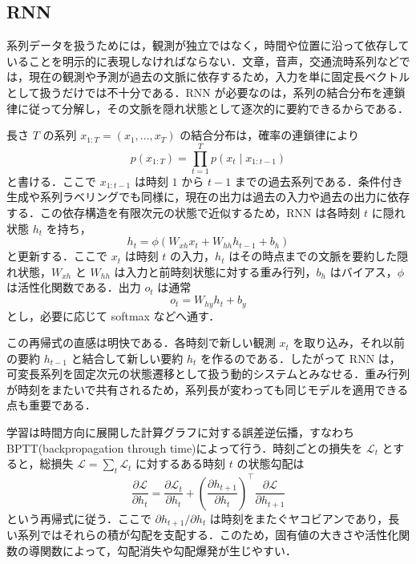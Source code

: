 \subsection{RNN}
系列データを扱うためには，観測が独立ではなく，時間や位置に沿って依存していることを明示的に表現しなければならない．文章，音声，交通流時系列などでは，現在の観測や予測が過去の文脈に依存するため，入力を単に固定長ベクトルとして扱うだけでは不十分である．RNN が必要なのは，系列の結合分布を連鎖律に従って分解し，その文脈を隠れ状態として逐次的に要約できるからである．

長さ $T$ の系列 $x_{1:T}=(x_1,\dots,x_T)$ の結合分布は，確率の連鎖律により
\begin{equation}
p(x_{1:T})
= \prod_{t=1}^T p(x_t\mid x_{1:t-1})
\end{equation}
と書ける．ここで $x_{1:t-1}$ は時刻 $1$ から $t-1$ までの過去系列である．条件付き生成や系列ラベリングでも同様に，現在の出力は過去の入力や過去の出力に依存する．この依存構造を有限次元の状態で近似するため，RNN は各時刻 $t$ に隠れ状態 $h_t$ を持ち，
\begin{equation}
h_t = \phi(W_{xh}x_t + W_{hh}h_{t-1} + b_h)
\end{equation}
と更新する．ここで $x_t$ は時刻 $t$ の入力，$h_t$ はその時点までの文脈を要約した隠れ状態，$W_{xh}$ と $W_{hh}$ は入力と前時刻状態に対する重み行列，$b_h$ はバイアス，$\phi$ は活性化関数である．出力 $o_t$ は通常
\begin{equation}
o_t = W_{hy}h_t + b_y
\end{equation}
とし，必要に応じて softmax などへ通す．

この再帰式の直感は明快である．各時刻で新しい観測 $x_t$ を取り込み，それ以前の要約 $h_{t-1}$ と結合して新しい要約 $h_t$ を作るのである．したがって RNN は，可変長系列を固定次元の状態遷移として扱う動的システムとみなせる．重み行列が時刻をまたいで共有されるため，系列長が変わっても同じモデルを適用できる点も重要である．

学習は時間方向に展開した計算グラフに対する誤差逆伝播，すなわち BPTT(backpropagation through time)\cite{Werbos1990}によって行う．時刻ごとの損失を $\mathcal L_t$ とすると，総損失 $\mathcal L=\sum_t \mathcal L_t$ に対するある時刻 $t$ の状態勾配は
\begin{equation}
\frac{\partial \mathcal L}{\partial h_t}
= \frac{\partial \mathcal L_t}{\partial h_t}
+ \left(\frac{\partial h_{t+1}}{\partial h_t}\right)^\top
\frac{\partial \mathcal L}{\partial h_{t+1}}
\end{equation}
という再帰式に従う．ここで $\partial h_{t+1}/\partial h_t$ は時刻をまたぐヤコビアンであり，長い系列ではそれらの積が勾配を支配する．このため，固有値の大きさや活性化関数の導関数によって，勾配消失や勾配爆発が生じやすい．

